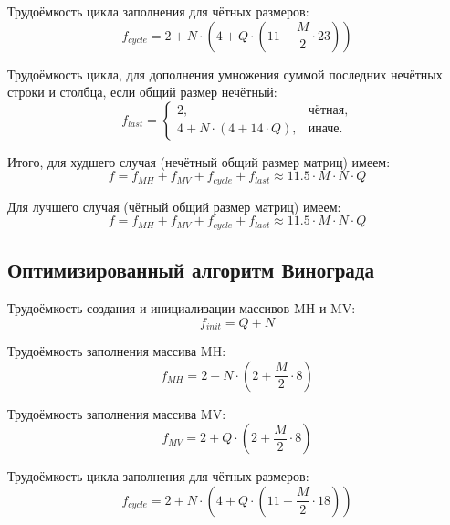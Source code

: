 Трудоёмкость цикла заполнения для чётных размеров:
\begin{equation}
	\label{for:cycle}
	f_{cycle} = 2 + N \cdot (4 + Q \cdot (11 + \frac{M}{2} \cdot 23))
\end{equation}
	
Трудоёмкость цикла, для дополнения умножения суммой последних нечётных строки и столбца, если общий размер нечётный:
\begin{equation}
	\label{for:last}
	f_{last} = \begin{cases}
		2, & \text{чётная,}\\
		4 + N \cdot (4 + 14\cdot Q), & \text{иначе.}
	\end{cases}
\end{equation}

Итого, для худшего случая (нечётный общий размер матриц) имеем:
\begin{equation}
	\label{for:bad}
	f =  f_{MH} + f_{MV} + f_{cycle} + f_{last}\approx 11.5 \cdot M\cdot N\cdot Q
\end{equation}

Для лучшего случая (чётный общий размер матриц) имеем:
\begin{equation}
	\label{for:good}
f =  f_{MH} + f_{MV} + f_{cycle} + f_{last} \approx 11.5 \cdot M\cdot N\cdot Q
\end{equation}


\subsection{Оптимизированный алгоритм Винограда}

Трудоёмкость создания и инициализации массивов MH и MV:
\begin{equation}
	\label{for:impr_init}
	f_{init} = Q + N
\end{equation}
	
Трудоёмкость заполнения массива MH:
\begin{equation}
	\label{for:impr_MH}
	f_{MH} =  2 + N\cdot(2 + \frac{M}{2} \cdot 8)
\end{equation}
	
Трудоёмкость заполнения массива MV:
\begin{equation}
	\label{for:impr_MV}
	f_{MV} =  2 + Q\cdot(2 + \frac{M}{2} \cdot 8)
\end{equation}
	
Трудоёмкость цикла заполнения для чётных размеров:
\begin{equation}
	\label{for:impr_cycle}
	f_{cycle} =2 + N \cdot (4 + Q \cdot (11 + \frac{M}{2} \cdot 18))
\end{equation}
	
